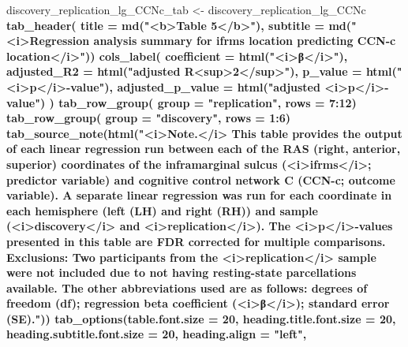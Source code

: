 \documentclass[
]{article}
\newenvironment{Shaded}{\begin{snugshade}}{\end{snugshade}}
\newcommand{\DataTypeTok}[1]{\textcolor[rgb]{0.13,0.29,0.53}{#1}}
\newcommand{\DecValTok}[1]{\textcolor[rgb]{0.00,0.00,0.81}{#1}}
\newcommand{\KeywordTok}[1]{\textcolor[rgb]{0.13,0.29,0.53}{\textbf{#1}}}
\newcommand{\NormalTok}[1]{#1}
\newcommand{\OperatorTok}[1]{\textcolor[rgb]{0.81,0.36,0.00}{\textbf{#1}}}
\newcommand{\StringTok}[1]{\textcolor[rgb]{0.31,0.60,0.02}{#1}}
\begin{document}
\begin{Shaded}
\begin{Highlighting}[]
\NormalTok{discovery_replication_lg_CCNc_tab <-}\StringTok{ }\NormalTok{discovery_replication_lg_CCNc }\OperatorTok{%>%}\StringTok{ }\KeywordTok{gt}\NormalTok{() }\OperatorTok{%>%}
\KeywordTok{tab_header}\NormalTok{(}
  \DataTypeTok{title =} \KeywordTok{md}\NormalTok{(}\StringTok{"<b>Table 5</b>"}\NormalTok{),}
  \DataTypeTok{subtitle =} \KeywordTok{md}\NormalTok{(}\StringTok{"<i>Regression analysis summary for ifrms location predicting CCN-c location</i>"}\NormalTok{)) }\OperatorTok{%>%}
\StringTok{  }\KeywordTok{cols_label}\NormalTok{(}
    \DataTypeTok{coefficient =} \KeywordTok{html}\NormalTok{(}\StringTok{"<i>β</i>"}\NormalTok{),}
    \DataTypeTok{adjusted_R2 =} \KeywordTok{html}\NormalTok{(}\StringTok{"adjusted R<sup>2</sup>"}\NormalTok{),}
    \DataTypeTok{p_value =} \KeywordTok{html}\NormalTok{(}\StringTok{"<i>p</i>-value"}\NormalTok{),}
    \DataTypeTok{adjusted_p_value =} \KeywordTok{html}\NormalTok{(}\StringTok{"adjusted <i>p</i>-value"}\NormalTok{)}
\NormalTok{    ) }\OperatorTok{%>%}
\StringTok{  }\KeywordTok{tab_row_group}\NormalTok{(}
    \DataTypeTok{group =} \StringTok{"replication"}\NormalTok{,}
    \DataTypeTok{rows =} \DecValTok{7}\OperatorTok{:}\DecValTok{12}\NormalTok{) }\OperatorTok{%>%}
\StringTok{  }\KeywordTok{tab_row_group}\NormalTok{(}
    \DataTypeTok{group =} \StringTok{"discovery"}\NormalTok{,}
    \DataTypeTok{rows =} \DecValTok{1}\OperatorTok{:}\DecValTok{6}\NormalTok{) }\OperatorTok{%>%}
\KeywordTok{tab_source_note}\NormalTok{(}\KeywordTok{html}\NormalTok{(}\StringTok{"<i>Note.</i> This table provides the output of each linear regression run between each of the RAS (right, anterior, superior) coordinates of the inframarginal sulcus (<i>ifrms</i>; predictor variable) and cognitive control network C (CCN-c; outcome variable). A separate linear regression was run for each coordinate in each hemisphere (left (LH) and right (RH)) and sample (<i>discovery</i> and <i>replication</i>). The <i>p</i>-values presented in this table are FDR corrected for multiple comparisons. Exclusions: Two participants from the <i>replication</i> sample were not included due to not having resting-state parcellations available. The other abbreviations used are as follows: degrees of freedom (df); regression beta coefficient (<i>β</i>); standard error (SE)."}\NormalTok{)) }\OperatorTok{%>%}
\StringTok{  }\KeywordTok{tab_options}\NormalTok{(}\DataTypeTok{table.font.size =} \DecValTok{20}\NormalTok{,}
    \DataTypeTok{heading.title.font.size =} \DecValTok{20}\NormalTok{,}
    \DataTypeTok{heading.subtitle.font.size =} \DecValTok{20}\NormalTok{,}
    \DataTypeTok{heading.align =} \StringTok{"left"}\NormalTok{,}
}}}}}}
\end{Highlighting}
\end{Shaded}
\end{document}
